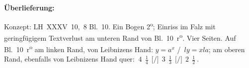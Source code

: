 %
%
%
%
%
\frenchspacing%
%
\begin{ledgroupsized}[r]{120mm}
\footnotesize
\pstart
\noindent\textbf{Überlieferung:}
\pend
\end{ledgroupsized}
\begin{ledgroupsized}[r]{114mm}
\footnotesize
\pstart \parindent -6mm
%
Konzept: LH~XXXV~10,~8 Bl.~10.
Ein Bogen 2\textsuperscript{o};
Einriss im Falz mit geringfügigem Textverlust am unteren Rand von Bl.~10~r\textsuperscript{o}.
Vier Seiten.
Auf Bl.~10~r\textsuperscript{o} am linken Rand, von Leibnizens Hand: $y=a^x$ \!\lbrack/\rbrack\ $ly=xla$;
am oberen Rand, ebenfalls von Leibnizens Hand quer:
$\ 4\ \ \frac{1}{4}\ \ \lbrack/\rbrack\ \ 3\ \ \frac{1}{3}\ \ \lbrack/\rbrack\ \ 2\ \ \frac{1}{2}\ .$
\pend
\end{ledgroupsized}
%
%
%
\frenchspacing%
%
%
\vspace{7mm}%
\count{}
\count{}
\count{}
\pstart%
\noindent%
\normalsize%
%
%
%
